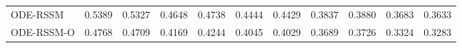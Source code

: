 \begin{table}
{\begin{tabular}{l|ll|ll|ll|ll|ll}
        \hline
        ODE-RSSM              & 0.5389  & 0.5327                   & 0.4648 & 0.4738                 & 0.4444 & 0.4429                   & 0.3837 & 0.3880                 & 0.3683 & 0.3633            \\
        ODE-RSSM-O            & \cellcolor{Green!60} 0.4768 & \cellcolor{Green!60} 0.4709                   & \cellcolor{Green!30} 0.4169 & \cellcolor{Green!30} 0.4244                 &
        \cellcolor{Green!60} 0.4045 & \cellcolor{Green!60} 0.4029                   & \cellcolor{Green!60} 0.3689 & \cellcolor{Green!30} 0.3726                 & \cellcolor{Green!30} 0.3324 & \cellcolor{Green!30} 0.3283            \\
        \bottomrule
        \end{tabular}}
\label{tab:winding}
\end{table}

